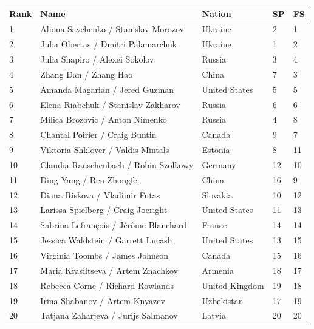 \documentclass{article}
\begin{document}
\begin{tabular}{lllll}
\toprule
Rank & Name & Nation & SP & FS \\
\midrule
1 & Aliona Savchenko / Stanislav Morozov & Ukraine & 2 & 1 \\
2 & Julia Obertas / Dmitri Palamarchuk & Ukraine & 1 & 2 \\
3 & Julia Shapiro / Alexei Sokolov & Russia & 3 & 4 \\
4 & Zhang Dan / Zhang Hao & China & 7 & 3 \\
5 & Amanda Magarian / Jered Guzman & United States & 5 & 5 \\
6 & Elena Riabchuk / Stanislav Zakharov & Russia & 6 & 6 \\
7 & Milica Brozovic / Anton Nimenko & Russia & 4 & 8 \\
8 & Chantal Poirier / Craig Buntin & Canada & 9 & 7 \\
9 & Viktoria Shklover / Valdis Mintals & Estonia & 8 & 11 \\
10 & Claudia Rauschenbach / Robin Szolkowy & Germany & 12 & 10 \\
11 & Ding Yang / Ren Zhongfei & China & 16 & 9 \\
12 & Diana Riskova / Vladimir Futas & Slovakia & 10 & 12 \\
13 & Larissa Spielberg / Craig Joeright & United States & 11 & 13 \\
14 & Sabrina Lefrançois / Jérôme Blanchard & France & 14 & 14 \\
15 & Jessica Waldstein / Garrett Lucash & United States & 13 & 15 \\
16 & Virginia Toombs / James Johnson & Canada & 15 & 16 \\
17 & Maria Krasiltseva / Artem Znachkov & Armenia & 18 & 17 \\
18 & Rebecca Corne / Richard Rowlands & United Kingdom & 19 & 18 \\
19 & Irina Shabanov / Artem Knyazev & Uzbekistan & 17 & 19 \\
20 & Tatjana Zaharjeva / Jurijs Salmanov & Latvia & 20 & 20 \\
\bottomrule
\end{tabular}
\end{document}
